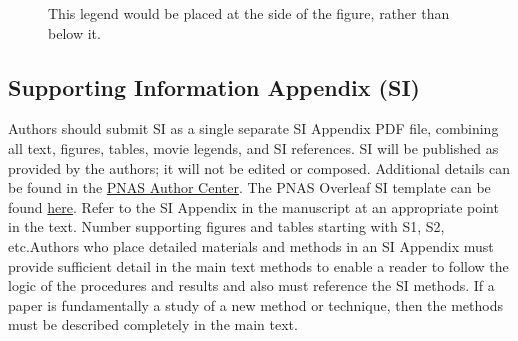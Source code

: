 \documentclass[
  letterpaper,
  DIV=11,
  numbers=noendperiod]{scrartcl}
\begin{document}
\begin{figure}


\caption{\label{fig-side}This legend would be placed at the side of the
figure, rather than below it.}

\end{figure}%

\subsection{Supporting Information Appendix
(SI)}\label{supporting-information-appendix-si}

Authors should submit SI as a single separate SI Appendix PDF file,
combining all text, figures, tables, movie legends, and SI references.
SI will be published as provided by the authors; it will not be edited
or composed. Additional details can be found in the
\href{https://www.pnas.org/authors/submitting-your-manuscript\#manuscript-formatting-guidelines}{PNAS
Author Center}. The PNAS Overleaf SI template can be found
\href{https://www.overleaf.com/latex/templates/pnas-template-for-supplementary-information/wqfsfqwyjtsd}{here}.
Refer to the SI Appendix in the manuscript at an appropriate point in
the text. Number supporting figures and tables starting with S1, S2,
etc.Authors who place detailed materials and methods in an SI Appendix
must provide sufficient detail in the main text methods to enable a
reader to follow the logic of the procedures and results and also must
reference the SI methods. If a paper is fundamentally a study of a new
method or technique, then the methods must be described completely in
the main text.
\end{document}

